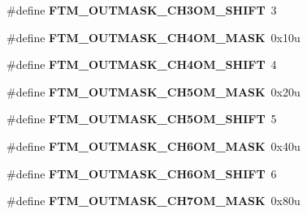 \begin{DoxyCompactItemize}
\item 
\hypertarget{group___f_t_m___register___masks_gaeb20c19e85755256c8336c06d5602852}{}\#define {\bfseries F\+T\+M\+\_\+\+O\+U\+T\+M\+A\+S\+K\+\_\+\+C\+H3\+O\+M\+\_\+\+S\+H\+I\+F\+T}~3\label{group___f_t_m___register___masks_gaeb20c19e85755256c8336c06d5602852}

\item 
\hypertarget{group___f_t_m___register___masks_ga89efa7258ffb29d1477ca5d7dc9ae870}{}\#define {\bfseries F\+T\+M\+\_\+\+O\+U\+T\+M\+A\+S\+K\+\_\+\+C\+H4\+O\+M\+\_\+\+M\+A\+S\+K}~0x10u\label{group___f_t_m___register___masks_ga89efa7258ffb29d1477ca5d7dc9ae870}

\item 
\hypertarget{group___f_t_m___register___masks_gacb820bca5f610439c9259fcbf80a75d8}{}\#define {\bfseries F\+T\+M\+\_\+\+O\+U\+T\+M\+A\+S\+K\+\_\+\+C\+H4\+O\+M\+\_\+\+S\+H\+I\+F\+T}~4\label{group___f_t_m___register___masks_gacb820bca5f610439c9259fcbf80a75d8}

\item 
\hypertarget{group___f_t_m___register___masks_ga36491b140fef946f30510e8028487986}{}\#define {\bfseries F\+T\+M\+\_\+\+O\+U\+T\+M\+A\+S\+K\+\_\+\+C\+H5\+O\+M\+\_\+\+M\+A\+S\+K}~0x20u\label{group___f_t_m___register___masks_ga36491b140fef946f30510e8028487986}

\item 
\hypertarget{group___f_t_m___register___masks_ga788fa594e321e3c5ae5b0dea445caf4c}{}\#define {\bfseries F\+T\+M\+\_\+\+O\+U\+T\+M\+A\+S\+K\+\_\+\+C\+H5\+O\+M\+\_\+\+S\+H\+I\+F\+T}~5\label{group___f_t_m___register___masks_ga788fa594e321e3c5ae5b0dea445caf4c}

\item 
\hypertarget{group___f_t_m___register___masks_ga015da8c828efae7c503a3a1d87c9007a}{}\#define {\bfseries F\+T\+M\+\_\+\+O\+U\+T\+M\+A\+S\+K\+\_\+\+C\+H6\+O\+M\+\_\+\+M\+A\+S\+K}~0x40u\label{group___f_t_m___register___masks_ga015da8c828efae7c503a3a1d87c9007a}

\item 
\hypertarget{group___f_t_m___register___masks_ga6c7e53365e176cea807c9d68ce0fb6ad}{}\#define {\bfseries F\+T\+M\+\_\+\+O\+U\+T\+M\+A\+S\+K\+\_\+\+C\+H6\+O\+M\+\_\+\+S\+H\+I\+F\+T}~6\label{group___f_t_m___register___masks_ga6c7e53365e176cea807c9d68ce0fb6ad}

\item 
\hypertarget{group___f_t_m___register___masks_gadf061026503672ed642b2d2f599afb98}{}\#define {\bfseries F\+T\+M\+\_\+\+O\+U\+T\+M\+A\+S\+K\+\_\+\+C\+H7\+O\+M\+\_\+\+M\+A\+S\+K}~0x80u\label{group___f_t_m___register___masks_gadf061026503672ed642b2d2f599afb98}


\end{DoxyCompactItemize}
